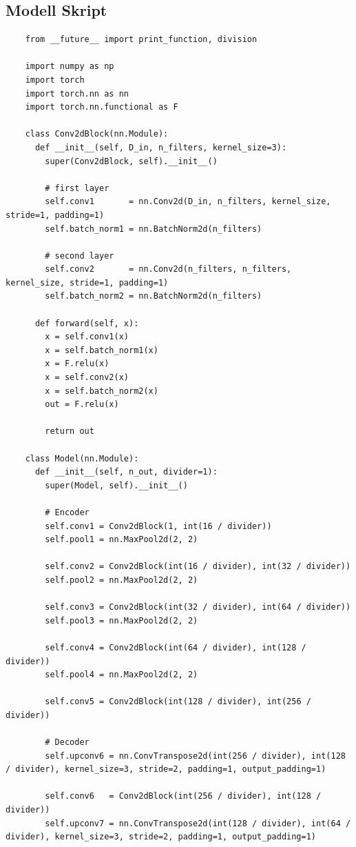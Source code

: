 \subsection{Modell Skript}
\begin{longlisting}
  \begin{verbatim}
    from __future__ import print_function, division

    import numpy as np
    import torch
    import torch.nn as nn
    import torch.nn.functional as F

    class Conv2dBlock(nn.Module):
      def __init__(self, D_in, n_filters, kernel_size=3):
        super(Conv2dBlock, self).__init__()

        # first layer
        self.conv1       = nn.Conv2d(D_in, n_filters, kernel_size, stride=1, padding=1)
        self.batch_norm1 = nn.BatchNorm2d(n_filters)

        # second layer
        self.conv2       = nn.Conv2d(n_filters, n_filters, kernel_size, stride=1, padding=1)
        self.batch_norm2 = nn.BatchNorm2d(n_filters)
      
      def forward(self, x):
        x = self.conv1(x)
        x = self.batch_norm1(x)
        x = F.relu(x)
        x = self.conv2(x)
        x = self.batch_norm2(x)
        out = F.relu(x)

        return out

    class Model(nn.Module):
      def __init__(self, n_out, divider=1):
        super(Model, self).__init__()
        
        # Encoder
        self.conv1 = Conv2dBlock(1, int(16 / divider))
        self.pool1 = nn.MaxPool2d(2, 2)

        self.conv2 = Conv2dBlock(int(16 / divider), int(32 / divider))
        self.pool2 = nn.MaxPool2d(2, 2)

        self.conv3 = Conv2dBlock(int(32 / divider), int(64 / divider))
        self.pool3 = nn.MaxPool2d(2, 2)

        self.conv4 = Conv2dBlock(int(64 / divider), int(128 / divider))
        self.pool4 = nn.MaxPool2d(2, 2)

        self.conv5 = Conv2dBlock(int(128 / divider), int(256 / divider))

        # Decoder
        self.upconv6 = nn.ConvTranspose2d(int(256 / divider), int(128 / divider), kernel_size=3, stride=2, padding=1, output_padding=1)

        self.conv6   = Conv2dBlock(int(256 / divider), int(128 / divider))
        self.upconv7 = nn.ConvTranspose2d(int(128 / divider), int(64 / divider), kernel_size=3, stride=2, padding=1, output_padding=1)


\end{verbatim}
\end{longlisting}
